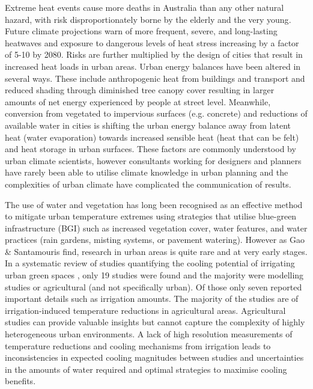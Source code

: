 Extreme heat events cause more deaths in Australia than any other natural hazard\cite{Coates2014}, with risk disproportionately borne by the elderly and the very young\cite{Nicholls2008}. Future climate projections warn of more frequent, severe, and long-lasting heatwaves\cite{IPCC2013a} and exposure to dangerous levels of heat stress increasing by a factor of 5-10 by 2080\cite{Coffel2018}. Risks are further multiplied by the design of cities\cite{Coutts2012,Martilli2020} that result in increased heat loads in urban areas. Urban energy balances have been altered in several ways\cite{Oke1982}. These include anthropogenic heat from buildings and transport and reduced shading through diminished tree canopy cover resulting in larger amounts of net energy experienced by people at street level. Meanwhile, conversion from vegetated to impervious surfaces (e.g. concrete) and reductions of available water in cities is shifting the urban energy balance away from latent heat (water evaporation) towards increased sensible heat (heat that can be felt) and heat storage in urban surfaces. These factors are commonly understood by urban climate scientists, however consultants working for designers and planners have rarely been able to utilise climate knowledge in urban planning\cite{Elasson2000} and the complexities of urban climate have complicated the communication of results\cite{Oke2006}.

The use of water and vegetation has long been recognised as an effective method \cite{Coutts2012,Bowler2010} to mitigate urban temperature extremes using strategies that utilise blue-green infrastructure (BGI)\cite{Norton2015,Gunawardena2017,Newton2020} such as increased vegetation cover, water features, and water practices (rain gardens, misting systems, or pavement watering). However as Gao \& Santamouris \cite{Gao2019} find, research in urban areas is quite rare and at very early stages. In a systematic review of studies quantifying the cooling potential of irrigating urban green spaces \cite{Cheung2021}, only 19 studies were found and the majority were modelling studies or agricultural (and not specifically urban). Of those only seven reported important details such as irrigation amounts. The majority of the studies are of irrigation-induced temperature reductions in agricultural areas. Agricultural studies can provide valuable insights but cannot capture the complexity of highly heterogeneous urban environments. A lack of high resolution measurements of temperature reductions and cooling mechanisms from irrigation leads to inconsistencies in expected cooling magnitudes between studies and uncertainties in the amounts of water required and optimal strategies to maximise cooling benefits. 

